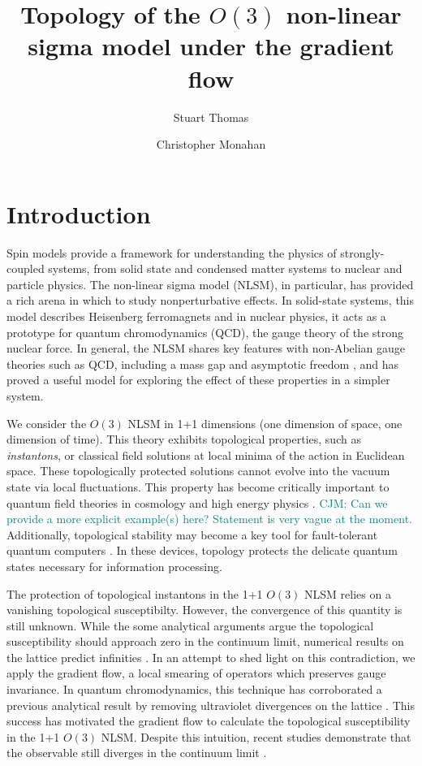 \documentclass[a4paper,11pt]{article}
\title{Topology of the $O(3)$ non-linear sigma model under the gradient flow}
\author*[a]{Stuart Thomas}
\author[a,b]{Christopher Monahan}
\affiliation[a]{Department of Physics, William \& Mary, \\ 300 Ukrop Way, Williamsburg, VA, USA} %
\affiliation[b]{Thomas Jefferson National Accelerator Facility, \\ 12000 Jefferson Avenue, Newport News, VA, USA} %
\newcommand\chris[1]{\textcolor{teal}{CJM: #1}}
\begin{document}
\maketitle


\section{Introduction}

Spin models provide a framework for understanding the physics of strongly-coupled systems, from solid state and condensed matter systems to nuclear and particle physics. The non-linear sigma model (NLSM), in particular, has provided a rich arena in which to study nonperturbative effects. In solid-state systems, this model describes Heisenberg ferromagnets \cite{callan1985} and in nuclear physics, it acts as a prototype for quantum chromodynamics (QCD), the gauge theory of the strong nuclear force. In general, the NLSM shares key features with non-Abelian gauge theories such as QCD, including a mass gap and asymptotic freedom \cite{polyakov1975}, and has proved a useful model for exploring the effect of these properties in a simpler system.

We consider the $O(3)$ NLSM in 1+1 dimensions (one dimension of space, one dimension of time). This theory exhibits topological properties, such as \textit{instantons}, or classical field solutions at local minima of the action in Euclidean space. These topologically protected solutions cannot evolve into the vacuum state via local fluctuations. This property has become critically important to quantum field theories in cosmology and high energy physics \cite{goddard1986}. \chris{Can we provide a more explicit example(s) here? Statement is very vague at the moment.} Additionally, topological stability may become a key tool for fault-tolerant quantum computers \cite{kitaev1997}. In these devices, topology protects the delicate quantum states necessary for information processing.

The protection of topological instantons in the 1+1 $O(3)$ NLSM relies on a vanishing topological susceptibilty. However, the convergence of this quantity is still unknown. \cite{bietenholz2018} While the some analytical arguments argue the topological susceptibility should approach zero in the continuum limit, numerical results on the lattice predict infinities \cite{berg1981}. In an attempt to shed light on this contradiction, we apply the gradient flow, a local smearing of operators which preserves gauge invariance. In quantum chromodynamics, this technique has corroborated a previous analytical result \cite{giusti2004} by removing ultraviolet divergences on the lattice \cite{bruno2014}. This success has motivated the gradient flow to calculate the topological susceptibility in the 1+1 $O(3)$ NLSM. Despite this intuition, recent studies demonstrate that the observable still diverges in the continuum limit \cite{bietenholz2018}.
\end{document}
